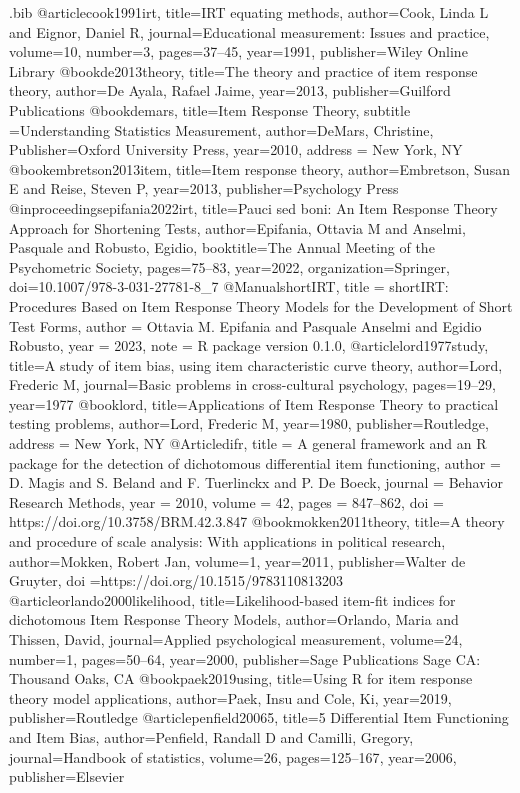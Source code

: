 \begin{filecontents*}{\jobname.bib}
@article{cook1991irt,
  title={IRT equating methods},
  author={Cook, Linda L and Eignor, Daniel R},
  journal={Educational measurement: Issues and practice},
  volume={10},
  number={3},
  pages={37--45},
  year={1991},
  publisher={Wiley Online Library}
}
@book{de2013theory,
  title={The theory and practice of item response theory},
  author={De Ayala, Rafael Jaime},
  year={2013},
  publisher={Guilford Publications}
}
@book{demars,
  title={Item Response Theory},
subtitle ={Understanding Statistics Measurement},
  author={DeMars, Christine},
  Publisher={Oxford University Press},
  year={2010},
  address =  {New York, NY}
}
@book{embretson2013item,
  title={Item response theory},
  author={Embretson, Susan E and Reise, Steven P},
  year={2013},
  publisher={Psychology Press}
}
@inproceedings{epifania2022irt,
  title={Pauci sed boni: An Item Response Theory Approach for Shortening Tests},
  author={Epifania, Ottavia M and Anselmi, Pasquale and Robusto, Egidio},
  booktitle={The Annual Meeting of the Psychometric Society},
  pages={75--83},
  year={2022},
  organization={Springer},
  doi={10.1007/978-3-031-27781-8\_7}
}
  @Manual{shortIRT,
    title = {shortIRT: Procedures Based on Item Response Theory Models for the
Development of Short Test Forms},
    author = {Ottavia M. Epifania and Pasquale Anselmi and Egidio Robusto},
    year = {2023},
    note = {R package version 0.1.0},
  }
@article{lord1977study,
  title={A study of item bias, using item characteristic curve theory},
  author={Lord, Frederic M},
  journal={Basic problems in cross-cultural psychology},
  pages={19--29},
  year={1977}
}
@book{lord,
  title={{Applications of Item Response Theory to practical testing problems}},
  author={Lord, Frederic M},
  year={1980},
  publisher={Routledge},
  address = {New York, NY}
}
@Article{difr,
    title = {A general framework and an R package for the detection of dichotomous differential item functioning},
    author = {D. Magis and S. Beland and F. Tuerlinckx and P. {De Boeck}},
    journal = {Behavior Research Methods},
    year = {2010},
    volume = {42},
    pages = {847--862},
    doi = {https://doi.org/10.3758/BRM.42.3.847}
  }
    @book{mokken2011theory,
  title={A theory and procedure of scale analysis: With applications in political research},
  author={Mokken, Robert Jan},
  volume={1},
  year={2011},
  publisher={Walter de Gruyter},
  doi ={https://doi.org/10.1515/9783110813203}
}
  @article{orlando2000likelihood,
  title={{Likelihood-based item-fit indices for dichotomous Item Response Theory Models}},
  author={Orlando, Maria and Thissen, David},
  journal={Applied psychological measurement},
  volume={24},
  number={1},
  pages={50--64},
  year={2000},
  publisher={Sage Publications Sage CA: Thousand Oaks, CA}
}
@book{paek2019using,
  title={Using R for item response theory model applications},
  author={Paek, Insu and Cole, Ki},
  year={2019},
  publisher={Routledge}
}
@article{penfield20065,
  title={5 Differential Item Functioning and Item Bias},
  author={Penfield, Randall D and Camilli, Gregory},
  journal={Handbook of statistics},
  volume={26},
  pages={125--167},
  year={2006},
  publisher={Elsevier}
}


\end{filecontents*}
